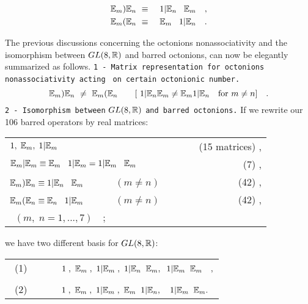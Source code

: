 \documentclass[a4paper,12pt]{book}
\begin{document}
\begin{eqnarray}
\Bbb{E}_{m}\mathbf{)}\Bbb{E}_{n} &~\equiv ~&1|\Bbb{E}_{n}\;\;\;\Bbb{E}%
_{m}\quad , \\
\Bbb{E}_{m}\mathbf{(}\Bbb{E}_{n} &~\equiv ~&\Bbb{E}_{m}\;\;\;1|\Bbb{E}%
_{n}\quad .
\end{eqnarray}

The previous discussions concerning the octonions nonassociativity and the
isomorphism between $GL(8,\Bbb{R})$ and barred octonions, can now be
elegantly summarized as follows.\newline
\texttt{1 - Matrix representation for octonions nonassociativity acting }%
\newline
\texttt{on certain octonionic number.} 
\[
\Bbb{E}_{m}\mathbf{)}\Bbb{E}_{n}~\neq ~\Bbb{E}_{m}\mathbf{(}\Bbb{E}_{n}\quad
\quad [~1|\Bbb{E}_{n}\Bbb{E}_{m}\neq \Bbb{E}_{m}1|\Bbb{E}_{n}~~%
\mbox{{ for
$m\neq n$}}]\quad . 
\]
\texttt{2 - Isomorphism between} \mbox{$GL(8, \Bbb{R})$} \texttt{and barred
octonions.}\newline
If we rewrite our 106 barred operators by real matrices:

\begin{center}
\begin{tabular}{lr}
$1,\;\Bbb{E}_{m},\;1|\Bbb{E}_{m}$ & {\ ~~~~~(15 matrices)} , \\ 
$\Bbb{E}_{m}|\Bbb{E}_{m}\equiv \Bbb{E}_{m}\;\;\;1|\Bbb{E}_{m}=1|\Bbb{E}%
_{m}\;\;\;\Bbb{E}_{m}$ & {\ (7)} , \\ 
$\Bbb{E}_{m}\mathbf{)}\Bbb{E}_{n}\equiv 1|\Bbb{E}_{n}\;\;\;\Bbb{E}_{m}$ ~~~~{%
\ $(m\neq n)$} & {\ (42)} , \\ 
$\Bbb{E}_{m}\mathbf{(}\Bbb{E}_{n}\equiv \Bbb{E}_{n}\;\;\;1|\Bbb{E}_{m}$ ~~~~{%
\ $(m\neq n)$} & {\ (42)} , \\ 
{\ $(m,\;n=1,...,7)\quad ;$} & 
\end{tabular}
\end{center}

we have two different basis for $GL(8, \Bbb{R})$:

\begin{center}
\begin{tabular}{cl}
{\ (1)} & ~~~~~$1\;,~\Bbb{E}_{m}\;,~1|\Bbb{E}_{m}\;,~1|\Bbb{E}_{n}\;\;\Bbb{E}%
_{m},\;\;1|\Bbb{E}_{m}\;\;\Bbb{E}_{m}\quad ,$ \\ 
&  \\ 
{\ (2)} & ~~~~~$1\;,~\Bbb{E}_{m}\;,~1|\Bbb{E}_{m}\;,~\Bbb{E}_{m}\;\;1|\Bbb{E}%
_{n},\quad 1|\Bbb{E}_{m}\;\;\Bbb{E}_{m}.$%
\end{tabular}
\end{center}
\end{document}
